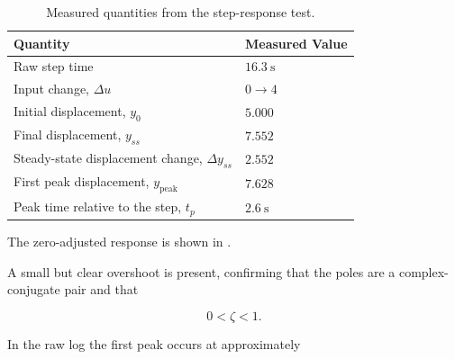 \documentclass[12pt,a4paper]{article}
\begin{document}
\begin{table}[H]
    \centering
    \caption{Measured quantities from the step-response test.}
    \label{tab:stepmeas}

    \renewcommand{\arraystretch}{1.35}

    \begin{tabular}{
        |>{\raggedright\arraybackslash}p{}
        |>{\centering\arraybackslash}p{}|
    }
        \hline

        \rowcolor{gray!15}
        \textbf{Quantity} &
        \textbf{Measured Value} \\

        \hline

        Raw step time &
        $16.3~\text{s}$ \\

        \hline

        Input change, $\Delta u$ &
        $0 \rightarrow 4$ \\

        \hline

        Initial displacement, $y_0$ &
        $5.000$ \\

        \hline

        Final displacement, $y_{ss}$ &
        $7.552$ \\

        \hline

        Steady-state displacement change, $\Delta y_{ss}$ &
        $2.552$ \\

        \hline

        First peak displacement, $y_{\mathrm{peak}}$ &
        $7.628$ \\

        \hline

        Peak time relative to the step, $t_p$ &
        $2.6~\text{s}$ \\

        \hline
    \end{tabular}
\end{table}

The zero-adjusted response is shown in
.

A small but clear overshoot is present, confirming that the poles
are a complex-conjugate pair and that

\[
0<\zeta<1.
\]

In the raw log the first peak occurs at approximately
\end{document}
